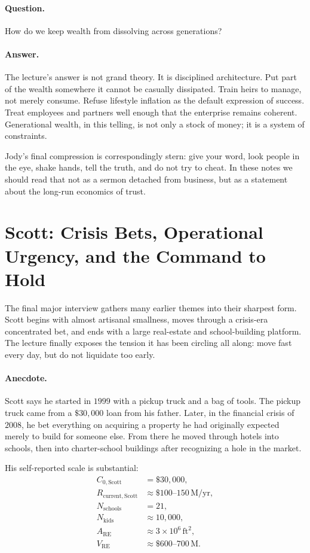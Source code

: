\paragraph{Question.}
How do we keep wealth from dissolving across generations?

\paragraph{Answer.}
The lecture's answer is not grand theory. It is disciplined architecture. Put part of the wealth somewhere it cannot be casually dissipated. Train heirs to manage, not merely consume. Refuse lifestyle inflation as the default expression of success. Treat employees and partners well enough that the enterprise remains coherent. Generational wealth, in this telling, is not only a stock of money; it is a system of constraints.

Jody's final compression is correspondingly stern: give your word, look people in the eye, shake hands, tell the truth, and do not try to cheat. In these notes we should read that not as a sermon detached from business, but as a statement about the long-run economics of trust.

\section{Scott: Crisis Bets, Operational Urgency, and the Command to Hold}

The final major interview gathers many earlier themes into their sharpest form. Scott begins with almost artisanal smallness, moves through a crisis-era concentrated bet, and ends with a large real-estate and school-building platform. The lecture finally exposes the tension it has been circling all along: move fast every day, but do not liquidate too early.

\paragraph{Anecdote.}
Scott says he started in \(1999\) with a pickup truck and a bag of tools. The pickup truck came from a \(\$30{,}000\) loan from his father. Later, in the financial crisis of \(2008\), he bet everything on acquiring a property he had originally expected merely to build for someone else. From there he moved through hotels into schools, then into charter-school buildings after recognizing a hole in the market.

His self-reported scale is substantial:
\begin{align}
C_{0,\mathrm{Scott}} &= \$30{,}000,\\
R_{\mathrm{current,Scott}} &\approx \$100\text{--}150\,\mathrm{M/yr},\\
N_{\mathrm{schools}} &= 21,\\
N_{\mathrm{kids}} &\approx 10{,}000,\\
A_{\mathrm{RE}} &\approx 3\times 10^6\,\mathrm{ft}^2,\\
V_{\mathrm{RE}} &\approx \$600\text{--}700\,\mathrm{M}.
\end{align}

